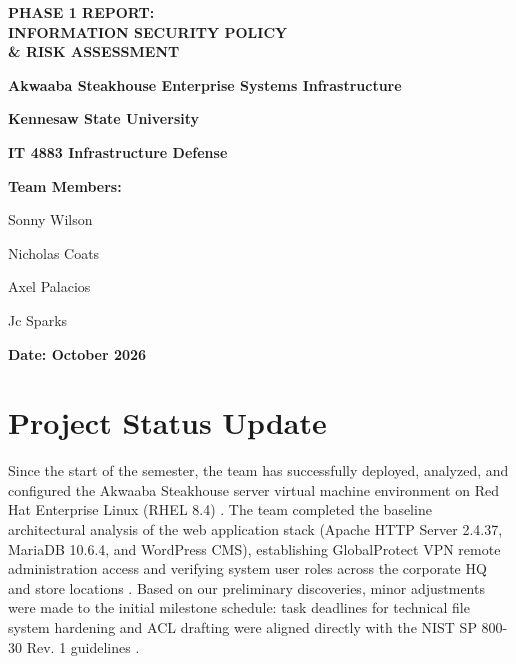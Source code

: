 \documentclass[10pt,a4paper]{article}
\begin{document}
\begin{titlepage}
    \centering
    \vspace*{1.5cm}
    
    {\Huge \bfseries PHASE 1 REPORT: \\ INFORMATION SECURITY POLICY \\ \& RISK ASSESSMENT \par}
    \vspace{0.5cm}
    {\Large \bfseries Akwaaba Steakhouse Enterprise Systems Infrastructure \par}
    
    \vspace{2cm}
    
    {\large \textbf{Kennesaw State University} \par}
    {\large \textbf{IT 4883 Infrastructure Defense} \par}
    
    \vspace{1.5cm}
    
    \textbf{\Large Team Members:} \\[0.4cm]
    {\large Sonny Wilson \par}
    {\large Nicholas Coats \par}
    {\large Axel Palacios \par}
    {\large Jc Sparks \par}
    
    \vfill
    
    {\large \textbf{Date: October 2026} \par}
    \vspace{1cm}
\end{titlepage}


\section{Project Status Update}

Since the start of the semester, the team has successfully deployed, analyzed, and configured the Akwaaba Steakhouse server virtual machine environment on Red Hat Enterprise Linux (RHEL 8.4) \cite{VMConnect, AkwaabaConfig}. The team completed the baseline architectural analysis of the web application stack (Apache HTTP Server 2.4.37, MariaDB 10.6.4, and WordPress CMS), establishing GlobalProtect VPN remote administration access and verifying system user roles across the corporate HQ and store locations \cite{VMConnect, AkwaabaConfig}. Based on our preliminary discoveries, minor adjustments were made to the initial milestone schedule: task deadlines for technical file system hardening and ACL drafting were aligned directly with the NIST SP 800-30 Rev. 1 guidelines \cite{Phase1Guide, RiskGuide}.
\end{document}

